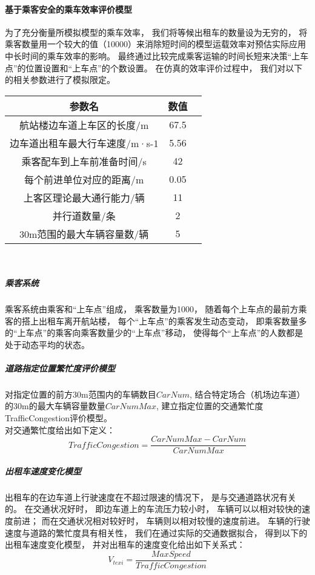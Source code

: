 \documentclass[withoutpreface,bwprint]{cumcmthesis} %
\begin{document}
\paragraph{基于乘客安全的乘车效率评价模型}
为了充分衡量所模拟模型的乘车效率， 我们将等候出租车的数量设为无穷的， 将乘客数量用一个较大的值（10000）来消除短时间的模型运载效率对预估实际应用中长时间的乘车效率的影响。
最终通过比较完成乘客运输的时间长短来决策“上车点”的位置设置和“上车点”的个数设置。 在仿真的效率评价过程中， 我们对以下的相关参数进行了模拟限定。
\begin{center}
	\begin{tabular}{ccc}
		\hline
		参数名&数值\\
		\hline
		航站楼边车道上车区的长度/m&67.5\\
		边车道出租车最大行车速度/m·s-1&5.56\\
		乘客配车到上车前准备时间/s&42\\
		每个前进单位对应的距离/m&0.05\\
		上客区理论最大通行能力/辆&11\\
		并行道数量/条&2\\
		30m范围的最大车辆容量数/辆&5 \\
		\hline
	\end{tabular}\\
\end{center}
\subparagraph{乘客系统}
乘客系统由乘客和“上车点”组成， 乘客数量为1000， 随着每个上车点的最前方乘客的搭上出租车离开航站楼， 每个“上车点”的乘客发生动态变动， 即乘客数量多的“上车点”的乘客向乘客数量少的“上车点”移动， 使得每个“上车点”的人数都是处于动态平均的状态。
\subparagraph{道路指定位置繁忙度评价模型}
对指定位置的前方30m范围内的车辆数目\(CarNum\), 结合特定场合（机场边车道）的30m的最大车辆容量数量\(CarNumMax\), 建立指定位置的交通繁忙度TrafficCongestion评价模型。\\
对交通繁忙度给出如下定义：
\begin{equation}
	TrafficCongestion = \frac{CarNumMax - CarNum}{CarNumMax}
\end{equation}
\subparagraph{出租车速度变化模型}
出租车的在边车道上行驶速度在不超过限速的情况下， 是与交通道路状况有关的。 在交通状况好时， 即边车道上的车流压力较小时， 车辆可以以相对较快的速度前进； 而在交通状况相对较好时， 车辆则以相对较慢的速度前进。 车辆的行驶速度与道路的繁忙度具有相关性， 我们在通过实际的交通数据拟合， 得到以下的出租车速度变化模型， 并对出租车的速度变化给出如下关系式：
\begin{equation}
	V_{texi} = \frac{MaxSpeed}{TrafficCongestion}
\end{equation}
\end{document}
